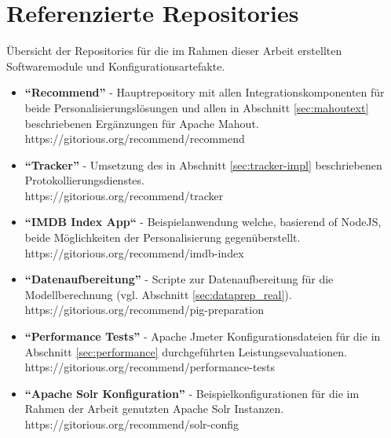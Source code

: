 \newpage
\section{Referenzierte Repositories}
\label{app:repos}

Übersicht der Repositories für die im Rahmen dieser Arbeit erstellten Softwaremodule und Konfigurationsartefakte.

\begin{itemize}
\item \textbf{``Recommend''} - Hauptrepository mit allen Integrationskomponenten für beide Personalisierungslösungen und allen in Abschnitt \ref{sec:mahoutext} beschriebenen Ergänzungen für Apache Mahout. \\ https://gitorious.org/recommend/recommend
\item \textbf{``Tracker''} -  Umsetzung des in Abschnitt \ref{sec:tracker-impl} beschriebenen Protokollierungsdienstes. \\ https://gitorious.org/recommend/tracker
\item \textbf{``IMDB Index App``} - Beispielanwendung welche, basierend of NodeJS, beide Möglichkeiten der Personalisierung gegenüberstellt. \\ https://gitorious.org/recommend/imdb-index
\item \textbf{``Datenaufbereitung''}  - Scripte zur Datenaufbereitung für die Modellberechnung (vgl. Abschnitt \ref{sec:dataprep_real}). \\ https://gitorious.org/recommend/pig-preparation
\item \textbf{``Performance Tests''} - Apache Jmeter Konfigurationsdateien für die in Abschnitt \ref{sec:performance} durchgeführten Leistungsevaluationen. \\ https://gitorious.org/recommend/performance-tests
\item \textbf{``Apache Solr Konfiguration''} - Beispielkonfigurationen für die im Rahmen der Arbeit genutzten Apache Solr Instanzen. \\ https://gitorious.org/recommend/solr-config
\end{itemize}

